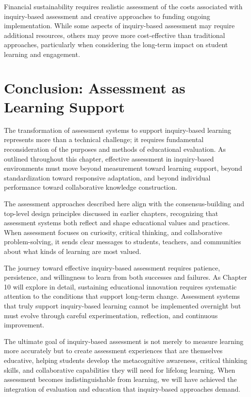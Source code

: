 \documentclass[
  Letterpaper,
]{scrbook}
\begin{document}
Financial sustainability requires realistic assessment of the costs
associated with inquiry-based assessment and creative approaches to
funding ongoing implementation. While some aspects of inquiry-based
assessment may require additional resources, others may prove more
cost-effective than traditional approaches, particularly when
considering the long-term impact on student learning and engagement.

\section{Conclusion: Assessment as Learning
Support}\label{conclusion-assessment-as-learning-support}

The transformation of assessment systems to support inquiry-based
learning represents more than a technical challenge; it requires
fundamental reconsideration of the purposes and methods of educational
evaluation. As outlined throughout this chapter, effective assessment in
inquiry-based environments must move beyond measurement toward learning
support, beyond standardization toward responsive adaptation, and beyond
individual performance toward collaborative knowledge construction.

The assessment approaches described here align with the
consensus-building and top-level design principles discussed in earlier
chapters, recognizing that assessment systems both reflect and shape
educational values and practices. When assessment focuses on curiosity,
critical thinking, and collaborative problem-solving, it sends clear
messages to students, teachers, and communities about what kinds of
learning are most valued.

The journey toward effective inquiry-based assessment requires patience,
persistence, and willingness to learn from both successes and failures.
As Chapter 10 will explore in detail, sustaining educational innovation
requires systematic attention to the conditions that support long-term
change. Assessment systems that truly support inquiry-based learning
cannot be implemented overnight but must evolve through careful
experimentation, reflection, and continuous improvement.

The ultimate goal of inquiry-based assessment is not merely to measure
learning more accurately but to create assessment experiences that are
themselves educative, helping students develop the metacognitive
awareness, critical thinking skills, and collaborative capabilities they
will need for lifelong learning. When assessment becomes
indistinguishable from learning, we will have achieved the integration
of evaluation and education that inquiry-based approaches demand.
\end{document}
